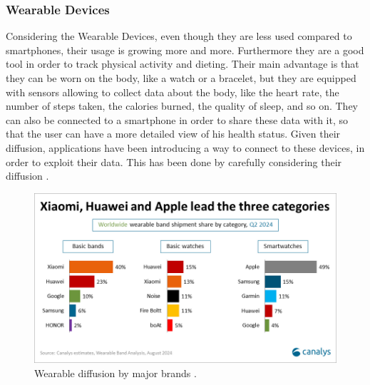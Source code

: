 \subsubsection{Wearable Devices} %
Considering the Wearable Devices, even though they are less used compared to smartphones, their usage is growing more and more. Furthermore they are a good tool in order to track physical activity and dieting. Their main advantage is that they can be worn on the body, like a watch or a bracelet, but they are equipped with sensors allowing to collect data about the body, like the heart rate, the number of steps taken, the calories burned, the quality of sleep, and so on. They can also be connected to a smartphone in order to share these data with it, so that the user can have a more detailed view of his health status. Given their diffusion, applications have been introducing a way to connect to these devices, in order to exploit their data. This has been done by carefully considering their diffusion \cite{WearableDevicesBrandDiffusion}.
\begin{figure}
    \includegraphics[width=1.0\linewidth]{./images/wearable_brand_diffusion.png}
    \caption[Wearable diffusion by major brands.]{Wearable diffusion by major brands \protect\cite{WearableDevicesBrandDiffusion}.}
    \label{fig:brandDiffusion}
\end{figure}
\FloatBarrier
